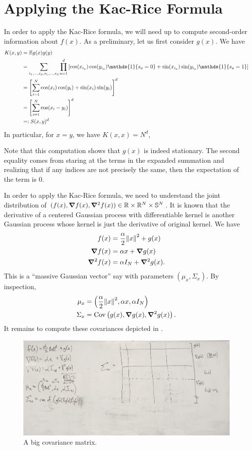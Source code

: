 \documentclass[12pt]{article}
\DeclareMathOperator{\Cov}{Cov}
\DeclarePairedDelimiter{\set}{\lbrace}{\rbrace}
\newcommand{\R}{\mathbb{R}}
\renewcommand{\S}{\mathbb{S}}
\newcommand{\E}{\mathbb{E}}
\newcommand{\ones}{\mathds{1}}
\begin{document}
\section{Applying the Kac-Rice Formula}
In order to apply the Kac-Rice formula,
we will need up to compute second-order information about $f(x)$.
As a preliminary,
let us first consider $g(x)$.
We have
\begin{align*}
  K(x, y)
  &= \E g(x)g(y) \\
  &= \sum_{i_1, \dots, i_d, s_1, \dots, s_d}
  \prod_{a=1}^d \left[ \cos(x_{i_a})\cos(y_{i_a})\ones\set{s_a=0} + \sin(x_{i_a})\sin(y_{i_a})\ones\set{s_a=1} \right] \\
  &= \left[ \sum_{i=1}^N \cos(x_i)\cos(y_i) + \sin(x_i)\sin(y_i) \right]^d \\
  &= \left[ \sum_{i=1}^N \cos(x_i-y_i) \right]^d \\
  &=: S(x, y)^d
\end{align*}
In particular,
for $x=y$,
we have $K(x, x) = N^d$,

Note that this computation shows that $g(x)$ is indeed stationary.
The second equality comes from staring at the terms in the expanded summation
and realizing that if any indices are not precisely the same,
then the expectation of the term is 0.

In order to apply the Kac-Rice formula,
we need to understand the joint distribution
of $(f(x), \grad f(x), \grad^2 f(x))\in \R\times \R^N\times \S^N$.
It is known that the derivative of a centered Gaussian process
with differentiable kernel is another Gaussian process
whose kernel is just the derivative of original kernel.
We have
\begin{align*}
  f(x) &= \frac\alpha2 \norm{x}^2 + g(x) \\
  \grad f(x) &= \alpha x + \grad g(x) \\
  \grad^2 f(x) &= \alpha I_N + \grad^2 g(x).
\end{align*}
This is a ``massive Gaussian vector'' say with parameters $(\mu_x, \Sigma_x)$.
By inspection,
\begin{align*}
  \mu_x &= \left( \frac\alpha2 \norm{x}^2, \alpha x, \alpha I_N \right) \\
  \Sigma_x &= \Cov\left( g(x), \grad g(x), \grad^2 g(x) \right).
\end{align*}
It remains to compute these covariances depicted in .
\begin{figure}[h]
  \centering
  \includegraphics[width=\linewidth]{fig/empty_matrix.jpeg}
  \caption{A big covariance matrix.}
  \label{fig:empty matrix}
\end{figure}
\end{document}
